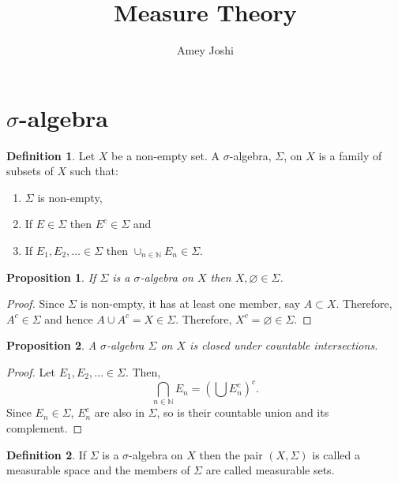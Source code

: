 \documentclass{article}
\theoremstyle{plain}
\numberwithin{thm}{section}
\theoremstyle{plain}
\newtheorem{prop}{Proposition}
\numberwithin{prop}{section}
\theoremstyle{definition}
\newtheorem{defn}{Definition}
\numberwithin{defn}{section}
\theoremstyle{remark}
\theoremstyle{plain}
\numberwithin{cor}{section}
\numberwithin{equation}{section}
\begin{document}
\title{Measure Theory}
\author{Amey Joshi}
\section{$\sigma$-algebra}\label{s1}
\begin{defn}\label{s1d1}
Let $X$ be a non-empty set. A $\sigma$-algebra, $\Sigma$, on $X$ is a family
of subsets of $X$ such that:
\begin{enumerate}
\item $\Sigma$ is non-empty,
\item If $E \in \Sigma$ then $E^c \in \Sigma$ and
\item If $E_1, E_2, \ldots \in \Sigma$ then $\cup_{n \in \mathbb{N}}E_n \in \Sigma$. 
\end{enumerate}
\end{defn}
\begin{prop}\label{s1p1}
If $\Sigma$ is a $\sigma$-algebra on $X$ then $X, \varnothing \in \Sigma$.
\end{prop}
\begin{proof}
Since $\Sigma$ is non-empty, it has at least one member, say $A \subset X$. 
Therefore, $A^c \in \Sigma$ and hence $A \cup A^c = X \in \Sigma$. 
Therefore, $X^c = \varnothing \in \Sigma$.
\end{proof}

\begin{prop}\label{s1p2}
A $\sigma$-algebra $\Sigma$ on $X$ is closed under countable intersections.
\end{prop}
\begin{proof}
Let $E_1, E_2, \ldots \in \Sigma$. Then,
\[
\bigcap_{n \in \mathbb{N}}E_n = \left(\bigcup E_n^c\right)^c.
\]
Since $E_n \in \Sigma$, $E_n^c$ are also in $\Sigma$, so is their
countable union and its complement.
\end{proof}

\begin{defn}\label{s1d2}
If $\Sigma$ is a $\sigma$-algebra on $X$ then the pair $(X, \Sigma)$
is called a measurable space and the members of $\Sigma$ are called measurable
sets.
\end{defn}
\end{document}
